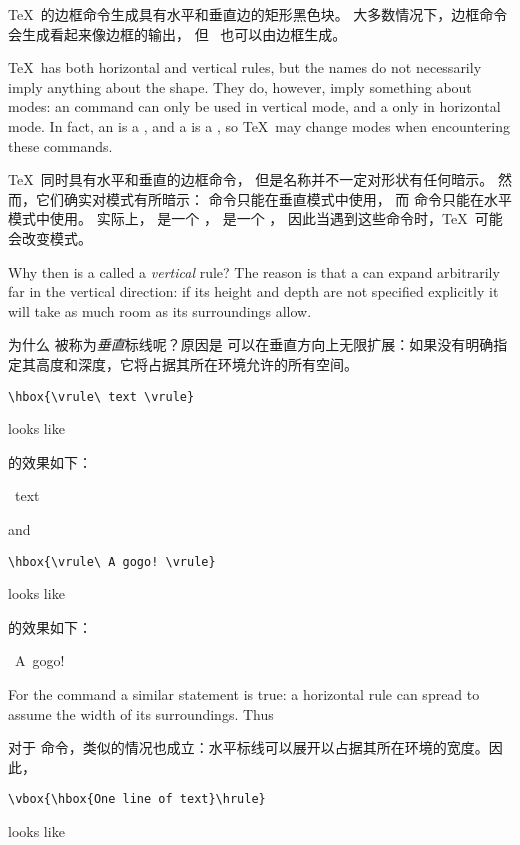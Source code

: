 \TeX\ 的边框命令生成具有水平和垂直边的矩形黑色块。
大多数情况下，边框命令会生成看起来像边框的输出，
但~\hbox{\vrule height 1.5ex width 1.5ex} 也可以由边框生成。

\TeX\ has both horizontal and vertical rules, 
but the names do not necessarily imply anything about the shape.
They do, however, imply something about modes:
an  command can only be used in vertical mode,
and a  only in horizontal mode.
In fact, an  is a , and a 
is a , so \TeX\ may change
modes when encountering these commands.

\TeX\ 同时具有水平和垂直的边框命令，
但是名称并不一定对形状有任何暗示。
然而，它们确实对模式有所暗示：
 命令只能在垂直模式中使用，
而  命令只能在水平模式中使用。
实际上， 是一个 ， 是一个 ，
因此当遇到这些命令时，\TeX\ 可能会改变模式。

Why then is a  called a {\em vertical\/} rule?
The reason is that a  can expand arbitrarily
far in the vertical direction: if its height and depth are not
specified explicitly it will take as much room as its
surroundings allow\altt.

为什么  被称为{\em 垂直}标线呢？原因是  可以在垂直方向上无限扩展：如果没有明确指定其高度和深度，它将占据其所在环境允许的所有空间\altt。

\begin{example}
\begin{verbatim}
\hbox{\vrule\ text \vrule}
\end{verbatim}
looks like 

的效果如下：\begin{disp}\leavevmode\hbox{\vrule\ text \vrule}\end{disp}
and 
\begin{verbatim}
\hbox{\vrule\ A gogo! \vrule}
\end{verbatim}
looks like

的效果如下：\begin{disp}\leavevmode\hbox{\vrule\ A gogo! \vrule}\end{disp}
\end{example}

For the  command a similar statement is true:
a horizontal rule can spread to assume the width of
its surroundings. Thus 

对于  命令，类似的情况也成立：水平标线可以展开以占据其所在环境的宽度。因此，
\begin{verbatim}
\vbox{\hbox{One line of text}\hrule}
\end{verbatim}
looks like
\begin{disp}\leavevmode{}\end{disp}


